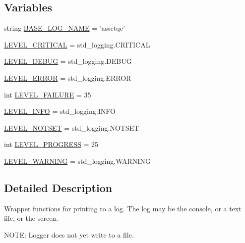 \subsection*{\-Variables}
\begin{DoxyCompactItemize}
\item 
string \hyperlink{namespaceassetQC_1_1api_1_1logger_a7a8a584df7e624aad04ca8798e2d03a2}{\-B\-A\-S\-E\-\_\-\-L\-O\-G\-\_\-\-N\-A\-M\-E} = 'assetqc'
\item 
\hyperlink{namespaceassetQC_1_1api_1_1logger_a468992b0c02e6c4f65b5c1e12f3ce4c7}{\-L\-E\-V\-E\-L\-\_\-\-C\-R\-I\-T\-I\-C\-A\-L} = std\-\_\-logging.\-C\-R\-I\-T\-I\-C\-A\-L
\item 
\hyperlink{namespaceassetQC_1_1api_1_1logger_adcb12392f9ecce22610365b03f303319}{\-L\-E\-V\-E\-L\-\_\-\-D\-E\-B\-U\-G} = std\-\_\-logging.\-D\-E\-B\-U\-G
\item 
\hyperlink{namespaceassetQC_1_1api_1_1logger_a2cd3b40d5cc56dba7a1027af2b4cbe58}{\-L\-E\-V\-E\-L\-\_\-\-E\-R\-R\-O\-R} = std\-\_\-logging.\-E\-R\-R\-O\-R
\item 
int \hyperlink{namespaceassetQC_1_1api_1_1logger_af699063e27ed0b2d27a882c478c05cbf}{\-L\-E\-V\-E\-L\-\_\-\-F\-A\-I\-L\-U\-R\-E} = 35
\item 
\hyperlink{namespaceassetQC_1_1api_1_1logger_a2d0ec0e69d77fb58748709a75413fc33}{\-L\-E\-V\-E\-L\-\_\-\-I\-N\-F\-O} = std\-\_\-logging.\-I\-N\-F\-O
\item 
\hyperlink{namespaceassetQC_1_1api_1_1logger_ac07086d7a5a87970687d8dda362f78db}{\-L\-E\-V\-E\-L\-\_\-\-N\-O\-T\-S\-E\-T} = std\-\_\-logging.\-N\-O\-T\-S\-E\-T
\item 
int \hyperlink{namespaceassetQC_1_1api_1_1logger_a2c175eef2e8626b69f9cf6c600315f13}{\-L\-E\-V\-E\-L\-\_\-\-P\-R\-O\-G\-R\-E\-S\-S} = 25
\item 
\hyperlink{namespaceassetQC_1_1api_1_1logger_a29eb7a8f36dc6cdbac2f6e11605b4c5b}{\-L\-E\-V\-E\-L\-\_\-\-W\-A\-R\-N\-I\-N\-G} = std\-\_\-logging.\-W\-A\-R\-N\-I\-N\-G
\end{DoxyCompactItemize}


\subsection{\-Detailed \-Description}
\begin{DoxyVerb}
Wrapper functions for printing to a log. The log may be the console, or a
text file, or the screen.

NOTE: Logger does not yet write to a file.
\end{DoxyVerb}
 

